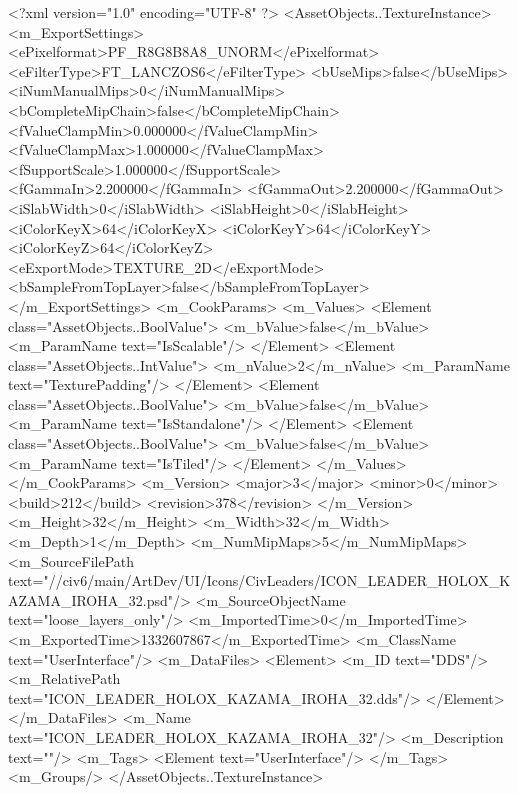 <?xml version="1.0" encoding="UTF-8" ?>
<AssetObjects..TextureInstance>
	<m_ExportSettings>
		<ePixelformat>PF_R8G8B8A8_UNORM</ePixelformat>
		<eFilterType>FT_LANCZOS6</eFilterType>
		<bUseMips>false</bUseMips>
		<iNumManualMips>0</iNumManualMips>
		<bCompleteMipChain>false</bCompleteMipChain>
		<fValueClampMin>0.000000</fValueClampMin>
		<fValueClampMax>1.000000</fValueClampMax>
		<fSupportScale>1.000000</fSupportScale>
		<fGammaIn>2.200000</fGammaIn>
		<fGammaOut>2.200000</fGammaOut>
		<iSlabWidth>0</iSlabWidth>
		<iSlabHeight>0</iSlabHeight>
		<iColorKeyX>64</iColorKeyX>
		<iColorKeyY>64</iColorKeyY>
		<iColorKeyZ>64</iColorKeyZ>
		<eExportMode>TEXTURE_2D</eExportMode>
		<bSampleFromTopLayer>false</bSampleFromTopLayer>
	</m_ExportSettings>
	<m_CookParams>
		<m_Values>
			<Element class="AssetObjects..BoolValue">
				<m_bValue>false</m_bValue>
				<m_ParamName text="IsScalable"/>
			</Element>
			<Element class="AssetObjects..IntValue">
				<m_nValue>2</m_nValue>
				<m_ParamName text="TexturePadding"/>
			</Element>
			<Element class="AssetObjects..BoolValue">
				<m_bValue>false</m_bValue>
				<m_ParamName text="IsStandalone"/>
			</Element>
			<Element class="AssetObjects..BoolValue">
				<m_bValue>false</m_bValue>
				<m_ParamName text="IsTiled"/>
			</Element>
		</m_Values>
	</m_CookParams>
	<m_Version>
		<major>3</major>
		<minor>0</minor>
		<build>212</build>
		<revision>378</revision>
	</m_Version>
	<m_Height>32</m_Height>
	<m_Width>32</m_Width>
	<m_Depth>1</m_Depth>
	<m_NumMipMaps>5</m_NumMipMaps>
	<m_SourceFilePath text="//civ6/main/ArtDev/UI/Icons/CivLeaders/ICON_LEADER_HOLOX_KAZAMA_IROHA_32.psd"/>
	<m_SourceObjectName text="loose_layers_only"/>
	<m_ImportedTime>0</m_ImportedTime>
	<m_ExportedTime>1332607867</m_ExportedTime>
	<m_ClassName text="UserInterface"/>
	<m_DataFiles>
		<Element>
			<m_ID text="DDS"/>
			<m_RelativePath text="ICON_LEADER_HOLOX_KAZAMA_IROHA_32.dds"/>
		</Element>
	</m_DataFiles>
	<m_Name text="ICON_LEADER_HOLOX_KAZAMA_IROHA_32"/>
	<m_Description text=""/>
	<m_Tags>
		<Element text="UserInterface"/>
	</m_Tags>
	<m_Groups/>
</AssetObjects..TextureInstance>

